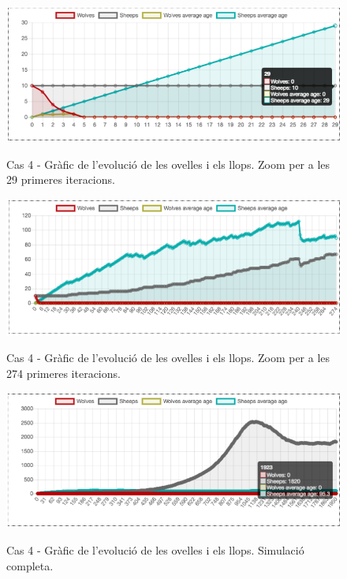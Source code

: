 \documentclass{article} %
\begin{document}
{	\begin{figure}[H]
		\begin{changemargin}{-1cm}{0.5cm}
			\includegraphics[width=14cm]{mod_case_12_graph_1}
			\centering
			\color{blue}
			\caption{Cas 4 - Gràfic de l'evolució de les ovelles i els llops. Zoom per a les 29 primeres iteracions.}\label{visina8}
  			\label{fig:cas4-zoom29}
		\end{changemargin}
	\end{figure}

	\begin{figure}[H]
		\begin{changemargin}{-1cm}{0.5cm}
			\includegraphics[width=14cm]{mod_case_12_graph_2}
			\centering
			\color{blue}
			\caption{Cas 4 - Gràfic de l'evolució de les ovelles i els llops. Zoom per a les 274 primeres iteracions.}\label{visina8}
  			\label{fig:cas4-zoom274}
		\end{changemargin}
	\end{figure}

	\begin{figure}[H]
		\begin{changemargin}{-1cm}{0.5cm}
			\includegraphics[width=14cm]{mod_case_12_graph_3}
			\centering
			\color{blue}
			\caption{Cas 4 - Gràfic de l'evolució de les ovelles i els llops. Simulació completa.}\label{visina8}
  			\label{fig:cas4-complete}
		\end{changemargin}
	\end{figure}
}
\end{document}
